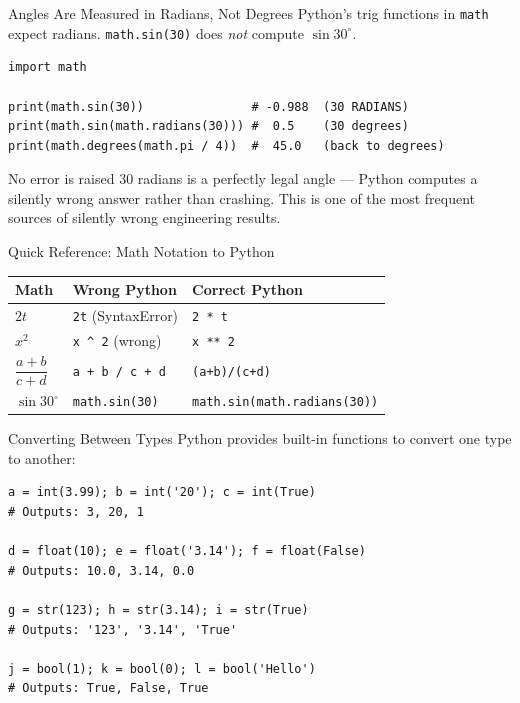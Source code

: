 \documentclass[9pt,aspectratio=169,xcolor=table]{beamer}
\newcommand{\striped}{\rowcolors{1}{white}{stripe}}
\begin{document}
\begin{frame}[fragile]{Angles Are Measured in Radians, Not Degrees}
    \leavevmode
    Python's trig functions in \texttt{math} expect \alert{radians}.
    \texttt{math.sin(30)} does \emph{not} compute $\sin 30^\circ$.

\begin{lstlisting}
import math

print(math.sin(30))               # -0.988  (30 RADIANS)
print(math.sin(math.radians(30))) #  0.5    (30 degrees)
print(math.degrees(math.pi / 4))  #  45.0   (back to degrees)
\end{lstlisting}

    \vspace{2mm}
    \begin{alertblock}{No error is raised}
        $30$ radians is a perfectly legal angle --- Python computes a
        silently wrong answer rather than crashing. This is one of the
        most frequent sources of silently wrong engineering results.
    \end{alertblock}
\end{frame}

\begin{frame}{Quick Reference: Math Notation to Python}
    \leavevmode
    \small
    \striped
    \begin{center}
    \begin{tabular}{p{3.0cm}p{3.6cm}p{3.6cm}}
        \toprule
        \textbf{Math} & \textbf{Wrong Python} & \textbf{Correct Python} \\
        \midrule
        $2t$ & \texttt{2t} (SyntaxError) & \texttt{2 * t} \\
        $x^2$ & \texttt{x \^{} 2} (wrong) & \texttt{x ** 2} \\
        $\dfrac{a+b}{c+d}$ & \texttt{a + b / c + d} & \texttt{(a+b)/(c+d)} \\
        $\sin 30^\circ$ & \texttt{math.sin(30)} & \texttt{math.sin(}\newline\texttt{math.radians(30))} \\
        \bottomrule
    \end{tabular}
    \end{center}
\end{frame}

\begin{frame}[fragile]{Converting Between Types}
    \leavevmode
    Python provides built-in functions to convert one type to another:

\begin{lstlisting}
a = int(3.99); b = int('20'); c = int(True)
# Outputs: 3, 20, 1

d = float(10); e = float('3.14'); f = float(False)
# Outputs: 10.0, 3.14, 0.0

g = str(123); h = str(3.14); i = str(True)
# Outputs: '123', '3.14', 'True'

j = bool(1); k = bool(0); l = bool('Hello')
# Outputs: True, False, True
\end{lstlisting}
\end{frame}
\end{document}
